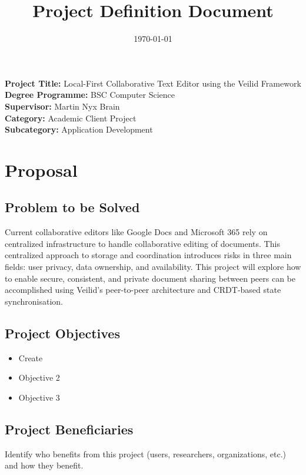 \documentclass[12pt,a4paper]{article}
\title{Project Definition Document}
\author{}
\date{\today}
\begin{document}
\maketitle
\vspace{2cm}

\begin{center}
\textbf{Project Title:} {Local-First Collaborative Text Editor using the Veilid Framework} \\[1cm]
\textbf{Degree Programme:} {BSC Computer Science} \\[1cm]
\textbf{Supervisor:} {Martin Nyx Brain} \\[1cm]
\textbf{Category:} Academic Client Project \\[0.3cm]
{\small \textbf{Subcategory:} Application Development} \\[1cm]

\end{center}

\newpage


\section{Proposal}

\subsection{Problem to be Solved}
Current collaborative editors like Google Docs and Microsoft 365 rely on centralized 
infrastructure to handle collaborative editing of documents. This centralized approach to
storage and coordination introduces risks in three main fields: user privacy, data
ownership, and availability. This project will explore how to enable secure, consistent,
and private document sharing between peers can be accomplished using Veilid's peer-to-peer
architecture and CRDT-based state synchronisation.


\subsection{Project Objectives}
\begin{itemize}[noitemsep]
    \item Create 
    \item Objective 2
    \item Objective 3
\end{itemize}

\subsection{Project Beneficiaries}
Identify who benefits from this project (users, researchers, organizations, etc.) and how they benefit.
\end{document}

